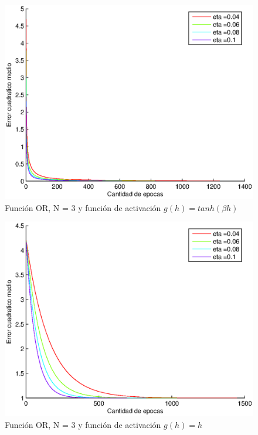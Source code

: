 \documentclass{sig-alternate}
\begin{document}
\begin{figure}[!ht]
	\includegraphics[scale=0.5]{images/PuriOr/OR_N3_err001_tanh.eps}
  \caption{Funci\'on OR, N = 3 y funci\'on de activaci\'on $g(h) = tanh(\beta h)$}
  \label{fig:tanh}
\end{figure}

\begin{figure}[!ht]
	\includegraphics[scale=0.5]{images/PuriOr/OR_N3_err001_lineal__error.eps}
  \caption{Funci\'on OR, N = 3 y funci\'on de activaci\'on $g(h) = h$}
  \label{fig:lineal}
\end{figure}
\end{document}
